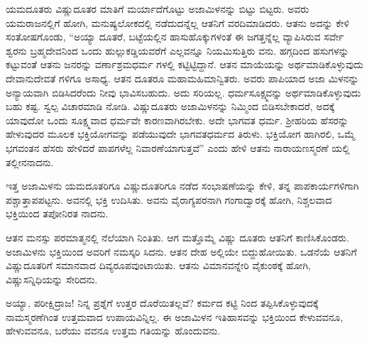 ಯಮದೂತರು ವಿಷ್ಣುದೂತರ ಮಾತಿಗೆ ಮರ್ಯಾದೆಗೊಟ್ಟು ಅಜಾಮಿಳನನ್ನು ಬಿಟ್ಟು ಬಿಟ್ಟರು. ಅವರು ಯಮರಾಜನಲ್ಲಿಗೆ ಹೋಗಿ, ಮನುಷ್ಯಲೋಕದಲ್ಲಿ ನಡೆದುದನ್ನೆಲ್ಲ ಆತನಿಗೆ ವರದಿಮಾಡಿದರು. ಆತನು ಅದನ್ನು ಕೇಳಿ ಸಂತೋಷಗೊಂಡು, “ಅಯ್ಯಾ ದೂತರೆ, ಬಟ್ಟೆಯಲ್ಲಿನ ಹಾಸುಹೊಕ್ಕುಗಳಂತೆ ಈ ಜಗತ್ತನ್ನೆಲ್ಲ ವ್ಯಾಪಿಸಿರುವ ಸರ್ವೇ ಶ್ವರನು ಬ್ರಹ್ಮದೇವನಿಂದ ಒಂದು ಹುಲ್ಲುಕಡ್ಡಿಯವರೆಗೆ ಎಲ್ಲವನ್ನೂ ನಿಯಮಿಸುತ್ತಿರು ವನು. ಹಗ್ಗದಿಂದ ಹಸುಗಳನ್ನು ಕಟ್ಟುವಂತೆ ಆತನು ಜನರನ್ನು ವರ್ಣಾಶ್ರಮಧರ್ಮ ಗಳಲ್ಲಿ ಕಟ್ಟಿಟ್ಟಿದ್ದಾನೆ. ಆತನ ಮಾಯೆಯನ್ನು ಅರ್ಥಮಾಡಿಕೊಳ್ಳುವುದು ದೇವಾನುದೇವತೆ ಗಳಿಗೂ ಅಸಾಧ್ಯ. ಆತನ ದೂತರೂ ಮಹಾಮಹಿಮಾನ್ವಿತರು. ಅವರು ಪಾಪಿಯಾದ ಅಜಾ ಮಿಳನನ್ನು ಅನ್ಯಾಯವಾಗಿ ಬಿಡಿಸಿದರೆಂದು ನೀವು ಭಾವಿಸಬಹುದು. ಅದು ಸರಿಯಲ್ಲ. ಧರ್ಮಸೂಕ್ಷ್ಮವನ್ನು ಅರ್ಥಮಾಡಿಕೊಳ್ಳುವುದು ಬಹು ಕಷ್ಟ. ಸ್ವಲ್ಪ ವಿಚಾರಮಾಡಿ ನೋಡಿ. ವಿಷ್ಣುದೂತರು ಅಜಾಮಿಳನನ್ನು ನಿಮ್ಮಿಂದ ಬಿಡಿಸಬೇಕಾದರೆ, ಅದಕ್ಕೆ ಯಾವುದೋ ಒಂದು ಸೂಕ್ಷ್ಮವಾದ ಧರ್ಮವೇ ಕಾರಣವಾಗಿರಬೇಕು. ಅದೇ ಭಾಗವತ ಧರ್ಮ. ಶ್ರೀಹರಿಯ ಹೆಸರನ್ನು ಹೇಳುವುದರ ಮೂಲಕ ಭಕ್ತಿಯೋಗವನ್ನು ಪಡೆಯುವುದೇ ಭಾಗವತಧರ್ಮದ ತಿರುಳು. ಭಕ್ತಿಯೋಗ ಹಾಗಿರಲಿ, ಒಮ್ಮೆ ಭಗವಂತನ ಹೆಸರು ಹೇಳಿದರೆ ಪಾಪಗಳೆಲ್ಲ ನಿವಾರಣೆಯಾಗುತ್ತವೆ” ಎಂದು ಹೇಳಿ ಆತನು ನಾರಾಯಣಸ್ಮರಣೆ ಯಲ್ಲಿ ತಲ್ಲೀನನಾದನು.

ಇತ್ತ ಅಜಾಮಿಳನು ಯಮದೂತರಿಗೂ ವಿಷ್ಣುದೂತರಿಗೂ ನಡೆದ ಸಂಭಾಷಣೆಯನ್ನು ಕೇಳಿ, ತನ್ನ ಪಾಪಕಾರ್ಯಗಳಿಗಾಗಿ ಪಶ್ಚಾತ್ತಾಪಪಟ್ಟನು. ಅವನಲ್ಲಿ ಭಕ್ತಿ ಉದಿಸಿತು. ಅವನು ವೈರಾಗ್ಯಪರನಾಗಿ ಗಂಗಾದ್ವಾರಕ್ಕೆ ಹೋಗಿ, ನಿಶ್ಚಲವಾದ ಭಕ್ತಿಯಿಂದ ತಪೋನಿರತ ನಾದನು.

ಆತನ ಮನಸ್ಸು ಪರಮಾತ್ಮನಲ್ಲಿ ನೆಲೆಯಾಗಿ ನಿಂತಿತು. ಆಗ ಮತ್ತೊಮ್ಮೆ ವಿಷ್ಣು ದೂತರು ಆತನಿಗೆ ಕಾಣಿಸಿಕೊಂಡರು. ಅಜಾಮಿಳನು ಭಕ್ತಿಯಿಂದ ಅವರಿಗೆ ನಮಸ್ಕರಿ ಸಿದನು. ಆತನ ದೇಹ ಅಲ್ಲಿಯೇ ಬಿದ್ದುಹೋಯಿತು. ಒಡನೆಯೆ ಆತನಿಗೆ ವಿಷ್ಣುದೂತರಿಗೆ ಸಮಾನವಾದ ದಿವ್ಯರೂಪವುಂಟಾಯಿತು. ಆತನು ವಿಮಾನವನ್ನೇರಿ ವೈಕುಂಠಕ್ಕೆ ಹೋಗಿ, ವಿಷ್ಣುಸನ್ನಿಧಿಯನ್ನು ಸೇರಿದನು.

ಅಯ್ಯಾ, ಪರೀಕ್ಷಿದ್ರಾಜ! ನಿನ್ನ ಪ್ರಶ್ನೆಗೆ ಉತ್ತರ ದೊರೆಯಿತಲ್ಲವೆ? ಕರ್ಮದ ಕಟ್ಟಿ ನಿಂದ ತಪ್ಪಿಸಿಕೊಳ್ಳುವುದಕ್ಕೆ ನಾಮಸ್ಮರಣೆಗಿಂತ ಉತ್ತಮವಾದ ಉಪಾಯವಿನ್ನಿಲ್ಲ. ಈ ಅಜಾಮಿಳನ ಇತಿಹಾಸವನ್ನು ಭಕ್ತಿಯಿಂದ ಕೇಳುವವನೂ, ಹೇಳುವವನೂ, ಬರೆಯು ವವನೂ ಉತ್ತಮ ಗತಿಯನ್ನು ಹೊಂದುವನು.

